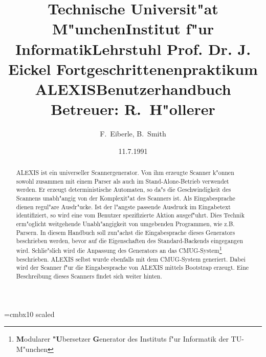 \author{F.~Eiberle, B.~Smith}
\font\bigbold=cmbx10 scaled 
\title{Technische Universit"at M"unchen\break Institut f"ur Informatik\break Lehrstuhl
Prof. Dr. J. Eickel \break \break \break
{\bf Fortgeschrittenenpraktikum}\break \break
{\bigbold ALEXIS\break Benutzerhandbuch}\break
\break Betreuer: R.~H"ollerer}
\date{11.7.1991}
\addtolength{\textheight}{5\baselineskip}
\setlength{\parindent}{0pt}
\setlength{\parskip}{5pt plus 2pt minus 1pt}
\frenchspacing
\sloppy
{}

\maketitle
\begin{abstract}
ALEXIS ist ein universeller Scannergenerator. Von ihm erzeugte Scanner k"onnen sowohl 
zusammen mit einem Parser als auch im Stand-Alone-Betrieb verwendet werden. Er erzeugt 
deterministische Automaten, so da"s die Geschwindigkeit des Scannens unabh"angig von 
der Komplexit"at des Scanners ist. Als Eingabesprache dienen regul"are Ausdr"ucke. Ist 
der l"angste passende Ausdruck im Eingabetext identifiziert, so wird eine vom Benutzer 
spezifizierte Aktion ausgef"uhrt. Dies Technik erm"oglicht weitgehende Unabh"angigkeit
von umgebenden Programmen, wie z.B. Parsern.\hfill \break
In diesem Handbuch soll zun"achst die Eingabesprache dieses Generators beschrieben
werden, bevor auf die Eigenschaften des Standard-Backends eingegangen wird. Schlie"slich
wird die Anpassung des Generators an das
CMUG-System\footnote{{\bf M}odularer {\bf "U}bersetzer {\bf G}enerator des Instituts 
f"ur Informatik der TU-M"unchen} beschrieben.\hfill \break
ALEXIS selbst wurde ebenfalls mit dem CMUG-System generiert. Dabei wird der Scanner
f"ur die Eingabesprache von ALEXIS mittels Bootstrap erzeugt. Eine Beschreibung dieses
Scanners findet sich weiter hinten.
\end{abstract}
\tableofcontents
